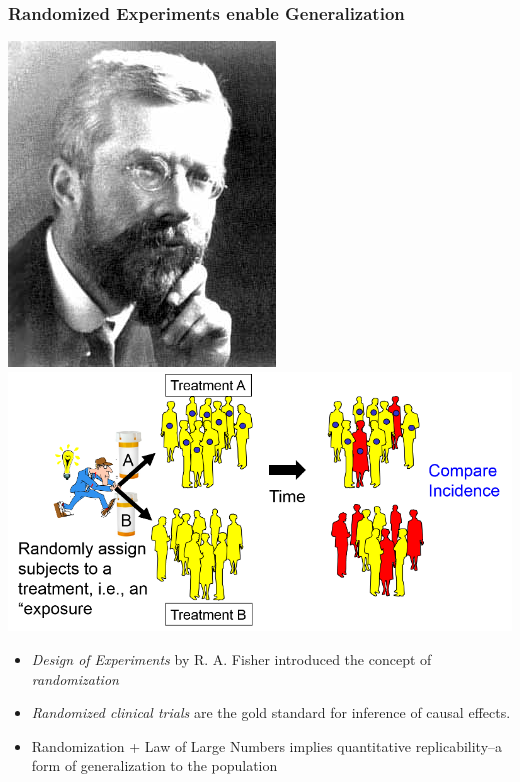 \documentclass{beamer}
\begin{document}
\begin{frame}
\frametitle{Randomized Experiments enable Generalization}
\begin{center}
\includegraphics[scale = 0.3]{RA_Fisher.jpg}
\includegraphics[scale = 0.2]{RCT_Cartoon.png}
\end{center}
\begin{itemize}
\item \emph{Design of Experiments} by R. A. Fisher introduced the concept of \emph{randomization}
\item \emph{Randomized clinical trials} are the gold standard
for inference of causal effects.
\item Randomization + Law of Large Numbers implies quantitative replicability--a form of generalization to the population
\end{itemize}
\end{frame}
\end{document}
